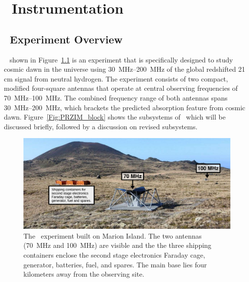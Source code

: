 \chapter{\prizm~Instrumentation}
\section{\prizm~Experiment Overview}

\prizm~\citep[\prizm;][]{2019JAI.....850004P} shown in Figure~\ref{Fig:prizm} is an experiment that is specifically designed to study cosmic dawn in the universe using \SIrange{30}{200}{\mega \hertz} of the global redshifted 21 cm signal from neutral hydrogen. The experiment consists of two compact, modified four-square antennas that operate at central observing frequencies of \SIrange{70}{100}{\mega \hertz}. The combined frequency range of both antennas spans \SIrange{30}{200}{\mega \hertz}, which brackets the predicted absorption feature from cosmic dawn. Figure~\ref{Fig:PRZIM_block} shows the subsystems of \prizm\, which will be discussed briefly, followed by a discussion on revised subsystems.

\begin{figure}
	\centering
	\includegraphics[width=\linewidth]{Figures/prizm.pdf}
	\caption{The \prizm\ experiment built on Marion Island. The two antennas (\SI{70}{\mega \hertz} and \SI{100}{\mega \hertz}) are visible and the the three shipping containers enclose the second stage electronics Faraday cage, generator, batteries, fuel, and spares. The main base lies four kilometers away from the observing site.}
	\label{Fig:prizm}
\end{figure}


